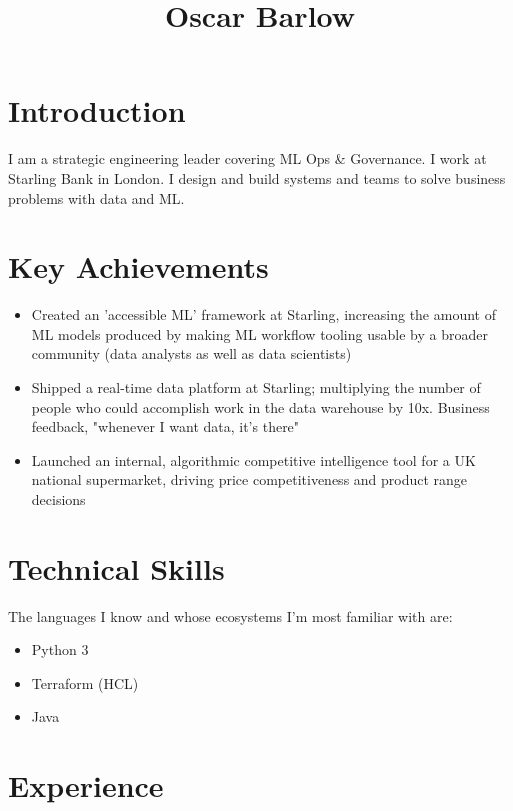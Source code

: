 \documentclass[a4paper,10pt]{article}
\date{}
\begin{document}
\title{Oscar Barlow}
\maketitle

\section*{Introduction}
I am a strategic engineering leader covering ML Ops & Governance. I work at
Starling Bank in London. I design and build systems and teams to solve business
problems with data and ML.

\section*{Key Achievements}
\begin{itemize}
      \item Created an 'accessible ML' framework at Starling, increasing the
            amount of ML models produced by making ML workflow tooling usable by
            a broader
            community (data analysts as well as data scientists)
      \item Shipped a real-time data platform at Starling; multiplying the number
            of people who could accomplish work in the data warehouse by 10x.
            Business
            feedback, "whenever I want data, it's there"
      \item Launched an internal, algorithmic competitive intelligence tool for a
            UK national supermarket, driving price competitiveness and product
            range
            decisions
\end{itemize}

\section*{Technical Skills}
The languages I know and whose ecosystems I'm most familiar with are:
\begin{itemize}
      \item Python 3
      \item Terraform (HCL)
      \item Java
\end{itemize}

\section*{Experience}
\end{document}
